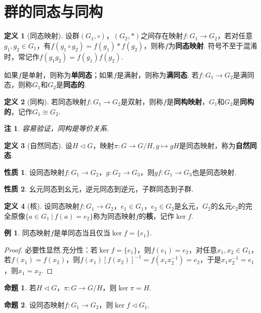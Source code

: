 \documentclass[12pt]{ctexart}
\theoremstyle{definition}
\newtheorem{definition}{定义}[section]
\newtheorem{property}{性质}[section]
\newtheorem{proposition}{命题}[section]
\newtheorem{example}{例}[section]
\theoremstyle{plain}
\newtheorem*{remark}{注}
\begin{document}
\section{群的同态与同构}
\begin{definition}[同态映射]
	设群$(G_1,\circ)$，$(G_2,\ast)$之间存在映射$f:G_1\to G_2$，若对任意$g_1,g_2\in G_1$，有$f(g_1\circ g_2)=f(g_1)\ast f(g_2)$，则称$f$为\textbf{同态映射}. 符号不至于混淆时，常记作$f(g_1g_2)=f(g_1)f(g_2)$.
\end{definition}
如果$f$是单射，则称为\textbf{单同态}；如果$f$是满射，则称为\textbf{满同态}. 若$f:G_1\to G_2$是满同态，则称$G_1$和$G_2$是\textbf{同态的}.
\begin{definition}[同构]
	若同态映射$f:G_1\to G_2$是双射，则称$f$是\textbf{同构映射}，$G_1$和$G_2$是\textbf{同构的}，记作$G_1\cong G_2$.
\end{definition}
\begin{remark}
	容易验证，同构是等价关系.
\end{remark}
\begin{definition}[自然同态]
	设$H\lhd G$，映射$\pi:G\to G/H,g\mapsto gH$是同态映射，称为\textbf{自然同态}.
\end{definition}
\begin{property}
	设同态映射$f:G_1\to G_2$，$g:G_2\to G_3$，则$gf:G_1\to G_3$也是同态映射.
\end{property}
\begin{property}
	幺元同态到幺元，逆元同态到逆元，子群同态到子群.
\end{property}
\begin{definition}[核]
	设同态映射$f:G_1\to G_2$，$e_1\in G_1$，$e_2\in G_2$是幺元，$G_2$的幺元$e_2$的完全原像$\{a\in G_1\ |\ f(a)=e_2\}$称为同态映射$f$的\textbf{核}，记作$\ker f$.
\end{definition}
\begin{example}
	同态映射$f$是单同态当且仅当$\ker f=\{e_1\}$.
\end{example}
\begin{proof}
	必要性显然.充分性：若$\ker f=\{e_1\}$，则$f(e_1)=e_2$，对任意$x_1,x_2\in G_1$，若$f(x_1)=f(x_2)$，则$f(x_1)\left[f(x_2)\right]^{-1}=f(x_1x_2^{-1})=e_2$，于是$x_1x_2^{-1}=e_1$，则$x_1=x_2$.
\end{proof}
\begin{proposition}
	若$H\lhd G$，$\pi:G\to G/H$，则$\ker\pi=H$.
\end{proposition}
\begin{proposition}
	设同态映射$f:G_1\to G_2$，则$\ker f\lhd G_1$.
\end{proposition}
\end{document}

